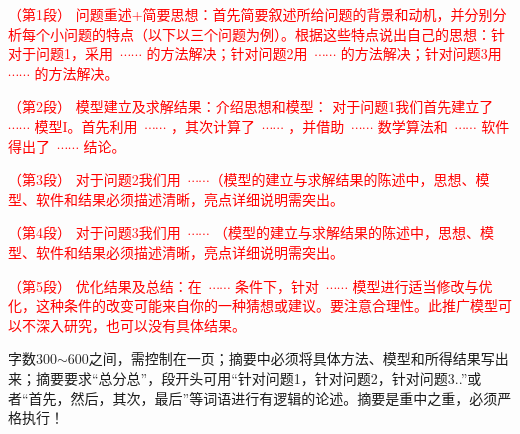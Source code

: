 

{\song\xiaosihao
\setlength{\parindent}{2em}\textcolor{red}{（第1段）	问题重述+简要思想：首先简要叙述所给问题的背景和动机，并分别分析每个小问题的特点（以下以三个问题为例）。根据这些特点说出自己的思想：针对于问题1，采用~$\cdots \cdots$ 的方法解决；针对问题2用~$\cdots \cdots$ 的方法解决；针对问题3用~$\cdots \cdots$ 的方法解决。}


\setlength{\parindent}{2em}\textcolor{red}{（第2段）	模型建立及求解结果：介绍思想和模型： 对于问题1我们首先建立了~$\cdots \cdots$ 模型I。首先利用~$\cdots \cdots$ ，其次计算了~$\cdots \cdots$ ，并借助~$\cdots \cdots$ 数学算法和~$\cdots \cdots$ 软件得出了~$\cdots \cdots$ 结论。}

\setlength{\parindent}{2em} \textcolor{red}{（第3段）	对于问题2我们用~$\cdots \cdots$（模型的建立与求解结果的陈述中，思想、模型、软件和结果必须描述清晰，亮点详细说明需突出。}

\setlength{\parindent}{2em}\textcolor{red}{（第4段）	对于问题3我们用~$\cdots \cdots$ （模型的建立与求解结果的陈述中，思想、模型、软件和结果必须描述清晰，亮点详细说明需突出。}

\setlength{\parindent}{2em}\textcolor{red}{（第5段）	优化结果及总结：在~$\cdots \cdots$ 条件下，针对~$\cdots \cdots$ 模型进行适当修改与优化，这种条件的改变可能来自你的一种猜想或建议。要注意合理性。此推广模型可以不深入研究，也可以没有具体结果。}
}

\begin{rmk}
字数300$\sim $600之间，需控制在一页；摘要中必须将具体方法、模型和所得结果写出来；摘要要求“总分总”，段开头可用“针对问题1，针对问题2，针对问题3..”或者“首先，然后，其次，最后”等词语进行有逻辑的论述。摘要是重中之重，必须严格执行！
\end{rmk}





